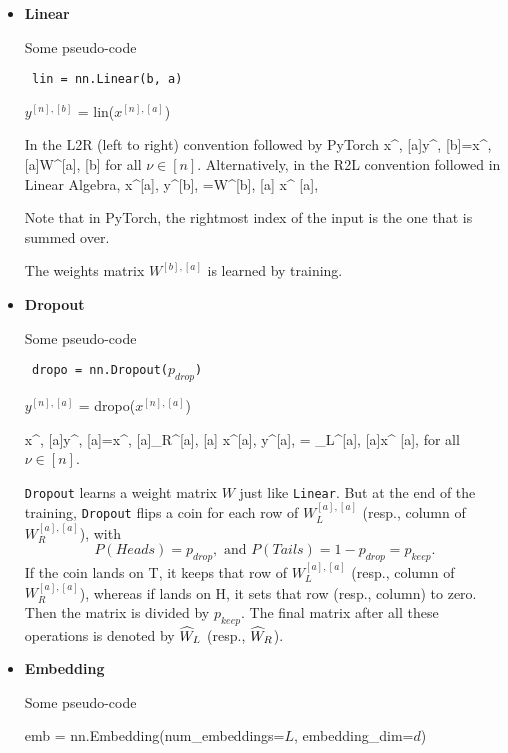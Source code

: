 \begin{itemize}
\item {\bf Linear}

Some pseudo-code
\begin{mdframed}[hidealllines=true,backgroundcolor=blue!10]
{\tt
lin = nn.Linear(b, a)

$y^{[n], [b]}$ = lin($x^{[n],[a]}$)
}
\end{mdframed}
In the L2R (left to right) convention followed by PyTorch
\beq
x^{\nu, [a]}\rarrow y^{\nu, [b]}=x^{\nu, [a]}W^{[a], [b]}
\eeq
for all  $\nu\in[n]$. Alternatively, in
the R2L convention followed in Linear Algebra,
\beq
x^{[a], \nu}\rarrow y^{[b], \nu}=W^{[b], [a]}
x^{ [a], \nu}
\eeq
 
Note that in PyTorch, the rightmost index of the input is the 
one that is summed over.

The weights matrix $W^{[b], [a]}$ is learned by training.

\item {\bf Dropout}

Some pseudo-code
\begin{mdframed}[hidealllines=true,backgroundcolor=blue!10]
{\tt
dropo = nn.Dropout($p_{drop}$)

$y^{[n], [a]}$ = dropo($x^{[n],[a]}$)
}
\end{mdframed}


\beq
x^{\nu, [a]}\rarrow y^{\nu, [a]}=x^{\nu, [a]}_R^{[a], [a]}
\;\;
\eeq
\beq
x^{[a], \nu}\rarrow y^{[a], \nu}=
_L^{[a], [a]}x^{ [a],\nu}
\;\;
\eeq
for all  $\nu\in[n]$.

{\tt Dropout} learns a weight matrix $W$ just like
{\tt Linear}. But at the end of the
training,
{\tt  Dropout} flips a coin
for each row of $W_L^{[a], [a]}$ (resp., column of $W_R^{[a],
 [a]}$), with $$P(Heads)=p_{drop}, \text{ and } P(Tails)=1-p_{drop}=p_{keep}.$$If the coin lands on T, it keeps that row of $W_L^{[a], [a]}$ (resp., column of $W_R^{[a], [a]}$), whereas if lands on H,
it sets that row (resp., column) to zero. Then the
matrix  is
divided by $p_{keep}$.
The final matrix after all these operations  is denoted by ${\widehat{W}}_L$ (resp., ${\widehat{W}}_R$).



\item {\bf Embedding}

Some pseudo-code
\begin{mdframed}[hidealllines=true,backgroundcolor=blue!10]
{\tt

emb = nn.Embedding(num\_embeddings=$L$, embedding\_dim=$d$)

}
\end{mdframed}
\end{itemize}
